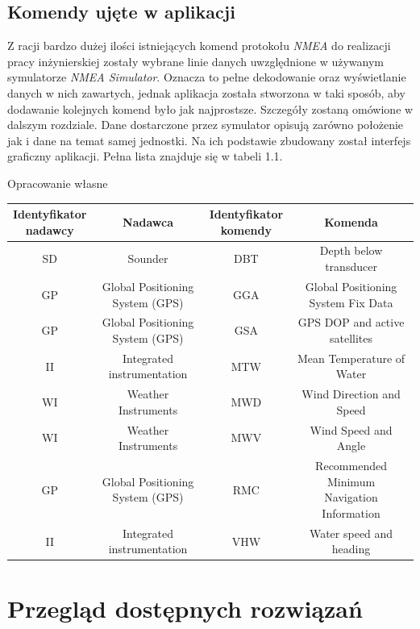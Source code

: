 \documentclass[skorowidz,skroty]{dyplomWEZUT}
\begin{document}
\section{Komendy ujęte w aplikacji}\label{sec:application sentences}
Z racji bardzo dużej ilości istniejących komend protokołu \textit{NMEA} do realizacji pracy inżynierskiej zostały wybrane linie danych uwzględnione w używanym symulatorze \textit{NMEA Simulator}. Oznacza to pełne dekodowanie oraz wyświetlanie danych w nich zawartych, jednak aplikacja została stworzona w taki sposób, aby dodawanie kolejnych komend było jak najprostsze. Szczegóły zostaną omówione w dalszym rozdziale. Dane dostarczone przez symulator opisują zarówno położenie jak i dane na temat samej jednostki. Na ich podstawie zbudowany został interfejs graficzny aplikacji. Pełna lista znajduje się w tabeli 1.1.

{Opracowanie własne}
{\begin{tabular}{c|c|c|c}
\thead{Identyfikator \\ nadawcy} & Nadawca & \thead{Identyfikator \\ komendy} & Komenda \\\hline\hline
SD & Sounder & DBT & Depth below transducer\\
\hline
GP & \makecell{Global Positioning \\ System (GPS)} & GGA & Global Positioning System Fix Data\\
\hline
GP & \makecell{Global Positioning \\ System (GPS)} & GSA & GPS DOP and active satellites\\
\hline
II & Integrated instrumentation & MTW & Mean Temperature of Water\\
\hline
WI & Weather Instruments & MWD & Wind Direction and Speed\\
\hline
WI & Weather Instruments & MWV &  Wind Speed and Angle\\
\hline
GP &\makecell{Global Positioning \\ System (GPS)} & RMC & \makecell{Recommended Minimum \\ Navigation Information}\\
\hline
II & Integrated instrumentation & VHW & Water speed and heading
\end{tabular}}

\chapter{Przegląd dostępnych rozwiązań}\label{chap: Available solutions}
\end{document}
